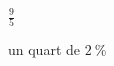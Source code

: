 




\begin{enonce}
$\frac{9}{5}$
\end{enonce}






\begin{enonce}
un quart de $\SI{2}{\%}$
\end{enonce}





\finEntrainement









\hauteurLargeurCadreReponse		{8mm}{3cm}
\initialisationEntrainement

